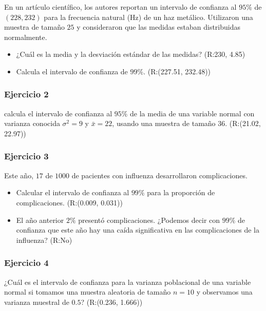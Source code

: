 \documentclass[
]{book}
\begin{document}
En un artículo científico, los autores reportan un intervalo de confianza al \(95\%\) de \((228, 232)\) para la frecuencia natural (Hz) de un haz metálico. Utilizaron una muestra de tamaño \(25\) y consideraron que las medidas estaban distribuidas normalmente.

\begin{itemize}
\item
  ¿Cuál es la media y la desviación estándar de las medidas? (R:230, 4.85)
\item
  Calcula el intervalo de confianza de \(99\%\). (R:(227.51, 232.48))
\end{itemize}

\hypertarget{ejercicio-2-11}{%
\subsubsection{Ejercicio 2}\label{ejercicio-2-11}}

calcula el intervalo de confianza al \(95\%\) de la media de una variable normal con varianza conocida \(\sigma^2=9\) y \(\bar{x}=22\), usando una muestra de tamaño \(36\). (R:(21.02, 22.97))

\hypertarget{ejercicio-3-8}{%
\subsubsection{Ejercicio 3}\label{ejercicio-3-8}}

Este año, \(17\) de \(1000\) de pacientes con influenza desarrollaron complicaciones.

\begin{itemize}
\item
  Calcular el intervalo de confianza al \(99\%\) para la proporción de complicaciones. (R:(0.009, 0.031))
\item
  El año anterior \(2\%\) presentó complicaciones. ¿Podemos decir con \(99\%\) de confianza que este año hay una caída significativa en las complicaciones de la influenza? (R:No)
\end{itemize}

\hypertarget{ejercicio-4-5}{%
\subsubsection{Ejercicio 4}\label{ejercicio-4-5}}

¿Cuál es el intervalo de confianza para la varianza poblacional de una variable normal si tomamos una muestra aleatoria de tamaño \(n=10\) y observamos una varianza muestral de \(0.5\)? (R:(0.236, 1.666))
\end{document}
